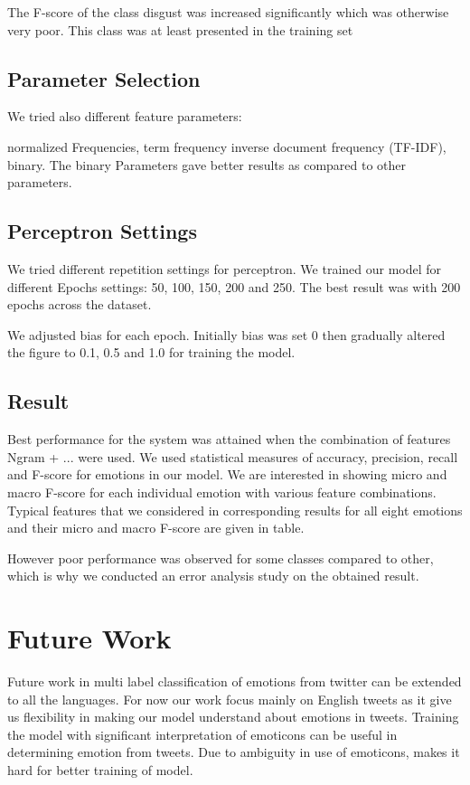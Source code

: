 \documentclass[11pt]{article}
\begin{document}
The F-score of the class disgust was increased significantly which was otherwise very poor. This class was at least presented in the training set

\subsection{Parameter Selection}


We tried also different feature parameters: 


normalized Frequencies, term frequency inverse document frequency (TF-IDF), binary. The binary Parameters gave better results as compared to other
parameters.


\subsection{Perceptron Settings}
We tried different repetition settings for perceptron. We trained our model for different Epochs settings:
50, 100, 150, 200 and 250. The best result was with 200 epochs across the dataset.

We adjusted bias for each epoch. Initially bias was set 0 then gradually altered the figure to 0.1, 0.5 and 1.0 for training the model.

\subsection{Result}

Best performance for the system was attained when the combination of features Ngram + ... were used. We used statistical measures of accuracy,
precision, recall and F-score for emotions in our model. We are interested in showing micro and macro F-score for each individual emotion with
various feature combinations. 
Typical features that we considered in corresponding results for all eight
emotions and their micro and macro F-score are given in table.

However poor performance was observed for some classes compared to other, which is why we conducted an error analysis study on the obtained result.

\section{Future Work}

Future work in multi label classification of emotions from twitter can be extended to all the languages. For now our work focus mainly on
English tweets as it give us flexibility in making our model understand about emotions in tweets. Training the model with significant interpretation
of emoticons can be useful in determining emotion from tweets. Due to ambiguity in use of emoticons, makes it hard for better training of model.
\end{document}
